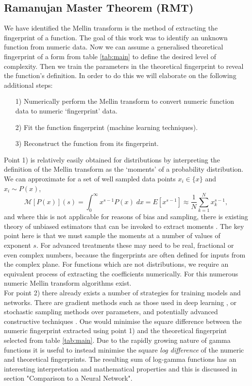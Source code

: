 \documentclass{article}
\begin{document}
\subsection{Ramanujan Master Theorem (RMT)}
We have identified the Mellin transform is the method of extracting the fingerprint of a function. The goal of this work was to identify an unknown function from numeric data. Now we can assume a generalised theoretical fingerprint of a form from table \ref{tab:main} to define the desired level of complexity. Then we train the parameters in the theoretical fingerprint to reveal the function's definition. In order to do this we will elaborate on the following additional steps: \begin{enumerate}
\item[1)] Numerically perform the Mellin transform to convert numeric function data to numeric `fingerprint' data.
\item[2)] Fit the function fingerprint (machine learning techniques).
\item[3)] Reconstruct the function from its fingerprint.
\end{enumerate}
Point 1) is relatively easily obtained for distributions by interpreting the definition of the Mellin transform as the `moments' of a probability distribution. We can approximate for a set of well sampled data points $x_i \in \{x\}$ and $x_i \sim P(x)$,
\begin{equation}
\mathcal{M}[P(x)](s) = \int_0^\infty x^{s-1} P(x) \; dx = E[x^{s-1}] \approx \frac{1}{N}\sum_{k=1}^N x_k^{s-1},
\end{equation}
and where this is not applicable for reasons of bias and sampling, there is existing theory of unbiased estimators that can be invoked to extract moments \cite{Zsohar2012}. The key point here is that we must sample the moments at a number of values of exponent $s$. For advanced treatments these may need to be real, fractional or even complex numbers, because the fingerprints are often defined for inputs from the complex plane. For functions which are not distributions, we require an equivalent process of extracting the coefficients numerically. For this numerous numeric Mellin transform algorithms exist.\\


For point 2) there already exists a number of strategies for training models and networks. There are gradient methods such as those used in deep learning \cite{Lecun2015,Kingma2015,Ruder2016}, or stochastic sampling methods over parameters, and potentially advanced constructive techniques \cite{Greenfeld2019}. One would minimise the square difference between the numeric fingerprint extracted using point 1) and the theoretical fingerprint selected from table \ref{tab:main}. Due to the rapidly growing nature of gamma functions it is useful to instead minimise the square \emph{log difference} of the numeric and theoretical fingerprints. The resulting sum of log-gamma functions has an interesting interpretation and mathematical properties and this is discussed in section "Comparison to a Neural Network".\\
\end{document}
